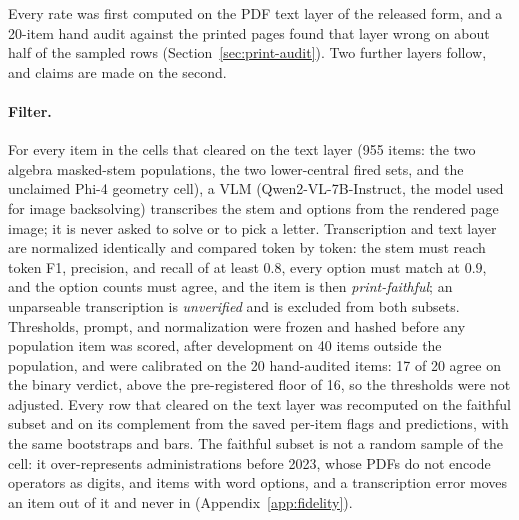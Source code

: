 Every rate was first computed on the PDF text layer of the released form, and a 20-item hand audit against the printed pages found that layer wrong on about half of the sampled rows (Section~\ref{sec:print-audit}). Two further layers follow, and claims are made on the second.

\paragraph{Filter.}
For every item in the cells that cleared on the text layer (955 items: the two algebra masked-stem populations, the two lower-central fired sets, and the unclaimed Phi-4 geometry cell), a VLM (Qwen2-VL-7B-Instruct, the model used for image backsolving) transcribes the stem and options from the rendered page image; it is never asked to solve or to pick a letter. Transcription and text layer are normalized identically and compared token by token: the stem must reach token F1, precision, and recall of at least $0.8$, every option must match at $0.9$, and the option counts must agree, and the item is then \emph{print-faithful}; an unparseable transcription is \emph{unverified} and is excluded from both subsets. Thresholds, prompt, and normalization were frozen and hashed before any population item was scored, after development on 40 items outside the population, and were calibrated on the 20 hand-audited items: 17 of 20 agree on the binary verdict, above the pre-registered floor of 16, so the thresholds were not adjusted. Every row that cleared on the text layer was recomputed on the faithful subset and on its complement from the saved per-item flags and predictions, with the same bootstraps and bars. The faithful subset is not a random sample of the cell: it over-represents administrations before 2023, whose PDFs do not encode operators as digits, and items with word options, and a transcription error moves an item out of it and never in (Appendix~\ref{app:fidelity}).

